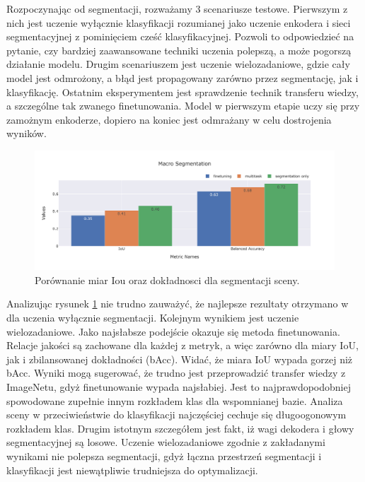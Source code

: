\vspace{0.5cm}
Rozpoczynając od segmentacji, rozważamy 3 scenariusze testowe. Pierwszym z nich jest uczenie wyłącznie klasyfikacji rozumianej jako uczenie enkodera i sieci segmentacyjnej z pominięciem cześć klasyfikacyjnej. Pozwoli to odpowiedzieć na pytanie, czy bardziej zaawansowane techniki uczenia polepszą, a może pogorszą działanie modelu. Drugim scenariuszem jest uczenie wielozadaniowe, gdzie cały model jest odmrożony, a błąd jest propagowany zarówno przez segmentację, jak i klasyfikację. Ostatnim eksperymentem jest sprawdzenie technik transferu wiedzy, a szczególne tak zwanego finetunowania. Model w pierwszym etapie uczy się przy zamożnym enkoderze, dopiero na koniec jest odmrażany w celu dostrojenia wyników.

\begin{figure}[ht!]
    \centering
    \includegraphics[width=\textwidth]{result_imgs_sorted/Macro-Segmentation.jpeg}
    \caption{Porównanie miar Iou oraz dokładnosci dla segmentacji sceny.}
    \label{fig:macro-segmentation}
\end{figure}

Analizując rysunek \ref{fig:macro-segmentation} nie trudno zauważyć, że najlepsze rezultaty otrzymano w dla uczenia wyłącznie segmentacji. Kolejnym wynikiem jest uczenie wielozadaniowe. Jako najsłabsze podejście okazuje się metoda finetunowania. Relacje jakości są zachowane dla każdej z metryk, a więc zarówno dla miary IoU, jak i zbilansowanej dokładności (bAcc). Widać, że miara IoU wypada gorzej niż bAcc. Wyniki mogą sugerować, że trudno jest przeprowadzić transfer wiedzy z ImageNetu, gdyż finetunowanie wypada najsłabiej. Jest to najprawdopodobniej spowodowane zupełnie innym rozkładem klas dla wspomnianej bazie. Analiza sceny w przeciwieństwie do klasyfikacji najczęściej cechuje się długoogonowym rozkładem klas. Drugim istotnym szczegółem jest fakt, iż wagi dekodera i głowy segmentacyjnej są losowe. Uczenie wielozadaniowe zgodnie z zakładanymi wynikami nie polepsza segmentacji, gdyż łączna przestrzeń segmentacji i klasyfikacji jest niewątpliwie trudniejsza do optymalizacji.

